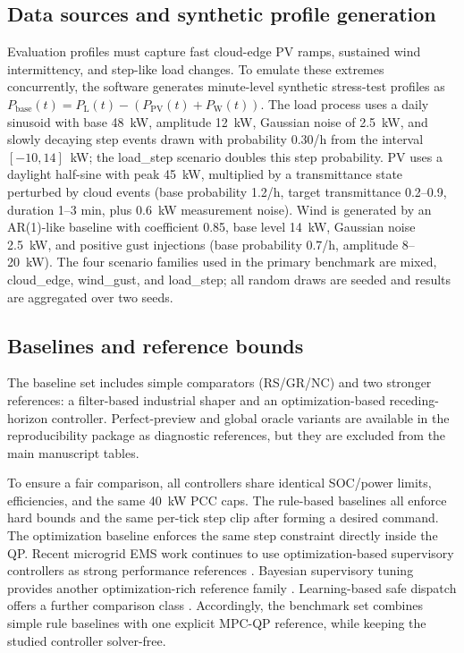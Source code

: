 \documentclass[preprint,12pt]{elsarticle}
\def\texttt#1{#1}%
\newcommand{\Pbase}{P_{\mathrm{base}}}
\newcommand{\Pload}{P_{\mathrm{L}}}
\newcommand{\Ppv}{P_{\mathrm{PV}}}
\newcommand{\Pwind}{P_{\mathrm{W}}}
\begin{document}
\subsection{Data sources and synthetic profile generation}
\label{subsec:synth_gen}
Evaluation profiles must capture fast cloud-edge PV ramps, sustained wind intermittency, and step-like load changes. To emulate these extremes concurrently, the software generates minute-level synthetic stress-test profiles as $\Pbase(t)=\Pload(t)-(\Ppv(t)+\Pwind(t))$. The load process uses a daily sinusoid with base 48~kW, amplitude 12~kW, Gaussian noise of 2.5~kW, and slowly decaying step events drawn with probability 0.30/h from the interval $[-10,14]$~kW; the \texttt{load\_step} scenario doubles this step probability. PV uses a daylight half-sine with peak 45~kW, multiplied by a transmittance state perturbed by cloud events (base probability 1.2/h, target transmittance 0.2--0.9, duration 1--3 min, plus 0.6~kW measurement noise). Wind is generated by an AR(1)-like baseline with coefficient 0.85, base level 14~kW, Gaussian noise 2.5~kW, and positive gust injections (base probability 0.7/h, amplitude 8--20~kW). The four scenario families used in the primary benchmark are \texttt{mixed}, \texttt{cloud\_edge}, \texttt{wind\_gust}, and \texttt{load\_step}; all random draws are seeded and results are aggregated over two seeds.

\subsection{Baselines and reference bounds}
\label{subsec:baselines}

The baseline set includes simple comparators (RS/GR/NC) and two stronger references: a filter-based industrial shaper and an optimization-based receding-horizon controller. Perfect-preview and global oracle variants are available in the reproducibility package as diagnostic references, but they are excluded from the main manuscript tables.

To ensure a fair comparison, all controllers share identical SOC/power limits, efficiencies, and the same 40~kW PCC caps. The rule-based baselines all enforce hard bounds and the same per-tick step clip after forming a desired command. The optimization baseline enforces the same step constraint directly inside the QP. Recent microgrid EMS work continues to use optimization-based supervisory controllers as strong performance references \cite{li2025twotimescale}. Bayesian supervisory tuning provides another optimization-rich reference family \cite{brown2026bayesian}. Learning-based safe dispatch offers a further comparison class \cite{yang2025shieldeddrl}. Accordingly, the benchmark set combines simple rule baselines with one explicit MPC-QP reference, while keeping the studied controller solver-free.
\end{document}

